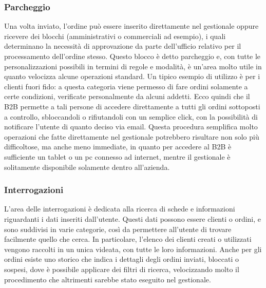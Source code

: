 \subsubsection{Parcheggio}
Una volta inviato, l'ordine può essere inserito direttamente nel gestionale oppure ricevere dei blocchi (amministrativi o commerciali ad esempio), i quali determinano la necessità di approvazione da parte dell'ufficio relativo per il processamento dell'ordine stesso. Questo blocco è detto parcheggio e, con tutte le personalizzazioni possibili in termini di regole e modalità, è un'area molto utile in quanto velocizza alcune operazioni standard. Un tipico esempio di utilizzo è per i clienti fuori fido: a questa categoria viene permesso di fare ordini solamente a certe condizioni, verificate personalmente da alcuni addetti. Ecco quindi che il B2B permette a tali persone di accedere direttamente a tutti gli ordini sottoposti a controllo, sbloccandoli o rifiutandoli con un semplice click, con la possibilità di notificare l'utente di quanto deciso via email. Questa procedura semplifica molto operazioni che fatte direttamente nel gestionale potrebbero risultare non solo più difficoltose, ma anche meno immediate, in quanto per accedere al B2B è sufficiente un tablet o un pc connesso ad internet, mentre il gestionale è solitamente disponibile solamente dentro all'azienda.

\subsubsection{Interrogazioni}
L'area delle interrogazioni è dedicata alla ricerca di schede e informazioni riguardanti i dati inseriti dall'utente. Questi dati possono essere clienti o ordini, e sono suddivisi in varie categorie, così da permettere all'utente di trovare facilmente quello che cerca. In particolare, l'elenco dei clienti creati o utilizzati vengono raccolti in un unica videata, con tutte le loro informazioni. Anche per gli ordini esiste uno storico che indica i dettagli degli ordini inviati, bloccati o sospesi, dove è possibile applicare dei filtri di ricerca, velocizzando molto il procedimento che altrimenti sarebbe stato eseguito nel gestionale.

